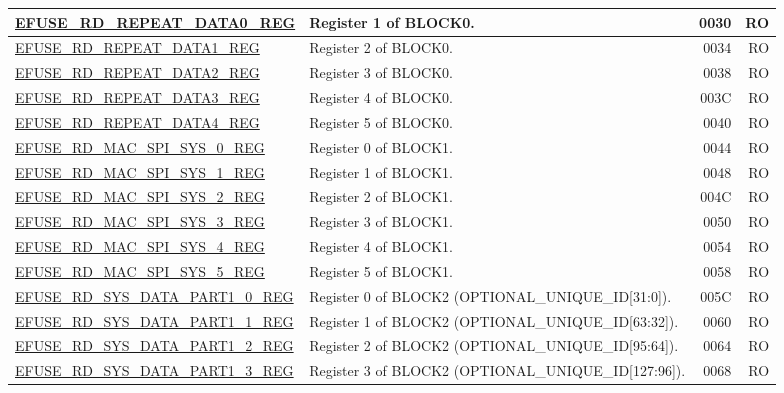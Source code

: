 \begin{longtable}{ | m{6cm} | m{7.2cm} | r| r | }
\hyperref[regdesc:EFUSERDREPEATDATA0REG]{EFUSE\_RD\_REPEAT\_DATA0\_REG} & Register 1 of BLOCK0. & \hexprefix{}0030 & RO \\ \hline
\hyperref[regdesc:EFUSERDREPEATDATA1REG]{EFUSE\_RD\_REPEAT\_DATA1\_REG} & Register 2 of BLOCK0. & \hexprefix{}0034 & RO \\ \hline
\hyperref[regdesc:EFUSERDREPEATDATA2REG]{EFUSE\_RD\_REPEAT\_DATA2\_REG} & Register 3 of BLOCK0. & \hexprefix{}0038 & RO \\ \hline
\hyperref[regdesc:EFUSERDREPEATDATA3REG]{EFUSE\_RD\_REPEAT\_DATA3\_REG} & Register 4 of BLOCK0. & \hexprefix{}003C & RO \\ \hline
\hyperref[regdesc:EFUSERDREPEATDATA4REG]{EFUSE\_RD\_REPEAT\_DATA4\_REG} & Register 5 of BLOCK0. & \hexprefix{}0040 & RO \\ \hline
\hyperref[regdesc:EFUSERDMACSPISYS0REG]{EFUSE\_RD\_MAC\_SPI\_SYS\_0\_REG} & Register 0 of BLOCK1. & \hexprefix{}0044 & RO \\ \hline
\hyperref[regdesc:EFUSERDMACSPISYS1REG]{EFUSE\_RD\_MAC\_SPI\_SYS\_1\_REG} & Register 1 of BLOCK1. & \hexprefix{}0048 & RO \\ \hline
\hyperref[regdesc:EFUSERDMACSPISYS2REG]{EFUSE\_RD\_MAC\_SPI\_SYS\_2\_REG} & Register 2 of BLOCK1. & \hexprefix{}004C & RO \\ \hline
\hyperref[regdesc:EFUSERDMACSPISYS3REG]{EFUSE\_RD\_MAC\_SPI\_SYS\_3\_REG} & Register 3 of BLOCK1. & \hexprefix{}0050 & RO \\ \hline
\hyperref[regdesc:EFUSERDMACSPISYS4REG]{EFUSE\_RD\_MAC\_SPI\_SYS\_4\_REG} & Register 4 of BLOCK1. & \hexprefix{}0054 & RO \\ \hline
\hyperref[regdesc:EFUSERDMACSPISYS5REG]{EFUSE\_RD\_MAC\_SPI\_SYS\_5\_REG} & Register 5 of BLOCK1. & \hexprefix{}0058 & RO \\ \hline
\hyperref[regdesc:EFUSERDSYSDATAPART10REG]{EFUSE\_RD\_SYS\_DATA\_PART1\_0\_REG} & Register 0 of BLOCK2 (OPTIONAL\_UNIQUE\_ID[31:0]). & \hexprefix{}005C & RO \\ \hline
\hyperref[regdesc:EFUSERDSYSDATAPART11REG]{EFUSE\_RD\_SYS\_DATA\_PART1\_1\_REG} & Register 1 of BLOCK2 (OPTIONAL\_UNIQUE\_ID[63:32]). & \hexprefix{}0060 & RO \\ \hline
\hyperref[regdesc:EFUSERDSYSDATAPART12REG]{EFUSE\_RD\_SYS\_DATA\_PART1\_2\_REG} & Register 2 of BLOCK2 (OPTIONAL\_UNIQUE\_ID[95:64]). & \hexprefix{}0064 & RO \\ \hline
\hyperref[regdesc:EFUSERDSYSDATAPART13REG]{EFUSE\_RD\_SYS\_DATA\_PART1\_3\_REG} & Register 3 of BLOCK2 (OPTIONAL\_UNIQUE\_ID[127:96]). & \hexprefix{}0068 & RO \\ \hline

\end{longtable}
